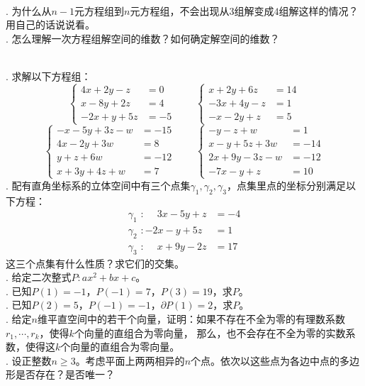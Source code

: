 \documentclass[12pt,UTF8,fontset=none]{ctexbook}
\begin{document}
\begin{sk}
    \mbox{} \\
    . 为什么从$n-1$元方程组到$n$元方程组，不会出现从$3$组解变成$4$组解这样的情况？用自己的话说说看。\\
    . 怎么理解一次方程组解空间的维数？如何确定解空间的维数？

\end{sk}

\begin{xt}
    \mbox{} \\
    . 求解以下方程组：
    $$ \left\{
        \begin{array}{rl}
    4x + 2y - z &= 0 \\
    x -  8y + 2z &= 4  \\
    -2x + y + 5z &= -5
    \end{array}
    \right. 
    \qquad\left\{
        \begin{array}{rl}
            x + 2y + 6z &= 14 \\
            -3x + 4y - z &= 1  \\
            -x -  2y + z &= 5 
    \end{array}
    \right. 
    $$  
    $$ \left\{
        \begin{array}{rl}
    -x - 5y + 3z  - w &= -15 \\
    4x - 2y + 3w &= 8 \\
    y + z  + 6w &= -12 \\
    x + 3y + 4z  + w &= 7
    \end{array}
    \right. 
    \qquad\left\{
        \begin{array}{rl}
            -y - z + w &= 1 \\
            x - y + 5z + 3w &= -14 \\
            2x + 9y - 3z  - w &= -12 \\
            -7x - y + z &= 10
    \end{array}
    \right. 
    $$  
    . 配有直角坐标系的立体空间中有三个点集$\gamma_1, \gamma_2, \gamma_3$，点集里点的坐标分别满足以下方程：
    \begin{align*}
        \gamma_1\,\,: \phantom{-}3x - 5y + z  &= -4 \\
        \gamma_2\,\,: -2x - y + 5z &= 1 \\
        \gamma_3\,\,: \phantom{-}x  + 9y - 2z &= 17
    \end{align*}
    这三个点集有什么性质？求它们的交集。\\
    . 给定二次整式$P: ax^2 + bx + c$。\\
    . 已知$P(1) = -1$，$P(-1) = 7$，$P(3) = 19$，求$P$。\\
    . 已知$P(2) = 5$，$P(-1) = -1$，$\partial P(1) = 2$，求$P$。\\
    . 给定$n$维平直空间中的若干个向量，证明：如果不存在不全为零的有理数系数$r_1, \cdots , r_k$，使得$k$个向量的直组合为零向量，
    那么，也不会存在不全为零的实数系数，使得这$k$个向量的直组合为零向量。\\
    . 设正整数$n\geqslant 3$。考虑平面上两两相异的$n$个点。依次以这些点为各边中点的多边形是否存在？是否唯一？
\end{xt}
\end{document}
